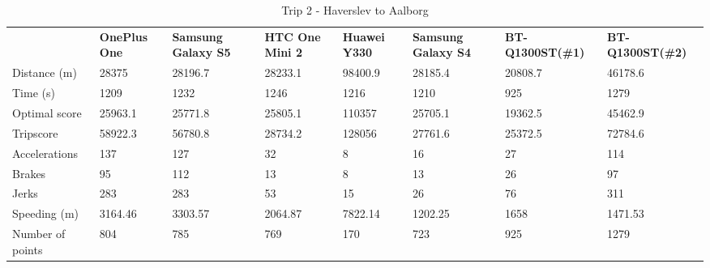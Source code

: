 \begin{table*}[tb]
\centering
\caption{Trip 2 - Haverslev to Aalborg}
\label{my-label}
\begin{tabular}{|l|lllllll|}
\hline
\rowcolor{tablegreen}

                 & \textbf{OnePlus One} & \textbf{Samsung Galaxy S5} & \textbf{HTC One Mini 2} & \textbf{Huawei Y330} & \textbf{Samsung Galaxy S4} & \textbf{BT-Q1300ST(\#1)} & \textbf{BT-Q1300ST(\#2)} \\
Distance (m)     & 28375       & 28196.7           & 28233.1        & 98400.9     & 28185.4           & 20808.7         & 46178.6         \\
Time (s)         & 1209        & 1232              & 1246           & 1216        & 1210              & 925             & 1279            \\
Optimal score    & 25963.1     & 25771.8           & 25805.1        & 110357      & 25705.1           & 19362.5         & 45462.9         \\
Tripscore        & 58922.3     & 56780.8           & 28734.2        & 128056      & 27761.6           & 25372.5         & 72784.6         \\
Accelerations    & 137         & 127               & 32             & 8           & 16                & 27              & 114             \\
Brakes           & 95          & 112               & 13             & 8           & 13                & 26              & 97              \\
Jerks            & 283         & 283               & 53             & 15          & 26                & 76              & 311             \\
Speeding (m)     & 3164.46     & 3303.57           & 2064.87        & 7822.14     & 1202.25           & 1658            & 1471.53         \\
Number of points & 804         & 785               & 769            & 170         & 723               & 925             & 1279      \\\hline     

\end{tabular}
\end{table*}

